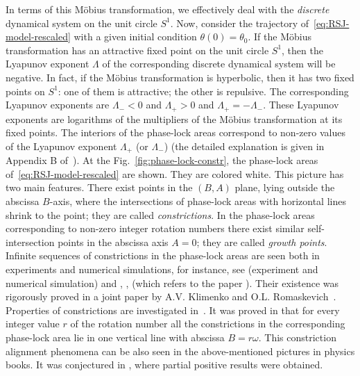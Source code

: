 \documentclass[preprint,12pt]{elsarticle}
\theoremstyle{plain}
\numberwithin{equation}{section}
\numberwithin{equation}{section}
\begin{document}
In terms of this M\"{o}bius transformation, we effectively deal with the \emph{discrete} dynamical system on the unit circle $S^1$. Now, consider the trajectory of~\eqref{eq:RSJ-model-rescaled} with a given initial condition $\theta(0)=\theta_0$. If the M\"{o}bius transformation has an attractive fixed point on the unit circle $S^1$, then the Lyapunov exponent $\Lambda$ of the corresponding discrete dynamical system will be negative. In fact, if the M\"{o}bius transformation is hyperbolic, then it has two fixed points on $S^1$:  one of them is attractive; the other is repulsive. The corresponding Lyapunov exponents are $\Lambda_{-}<0$ and $\Lambda_{+}>0$ and $\Lambda_{+}=-\Lambda_{-}$. These Lyapunov exponents are logarithms of the multipliers of the M\"{o}bius  transformation at its fixed points. The interiors of the phase-lock areas correspond to non-zero values of the Lyapunov exponent $\Lambda_{+}$ (or $\Lambda_{-}$) (the detailed explanation is given in Appendix B of~\cite{alexandrov2025}). At the Fig.~\ref{fig:phase-lock-constr}, the phase-lock areas of~\eqref{eq:RSJ-model-rescaled} are shown. They are colored white. This picture has two main features. There exist points in the $(B,A)$ plane, lying outside the abscissa $B$-axis, where the intersections of phase-lock areas with horizontal lines shrink to the point; they are called \emph{constrictions}.  In the phase-lock areas corresponding to non-zero integer rotation numbers there exist similar self-intersection points in the abscissa axis $A=0$; they  are called \emph{growth points}. Infinite sequences of constrictions in the phase-lock areas are seen both in experiments and numerical simulations, for instance, see \cite[fig. 3]{panghotra2020giant} (experiment and numerical simulation) and \cite[p. 193, fig. 11.4]{lich-rus}, 
\cite[p. 88, fig. 5.2]{likh-ulr},  \cite[p. 339, fig. 11.4]{lich} (which refers to the paper \cite{ls}). Their existence was rigorously proved in a joint paper by A.V. Klimenko and O.L. Romaskevich~\cite{klim-rom}. Properties of constrictions are investigated in~\cite{glutsyuk2014adjacency,glutsyuk2019constrictions,glutsyuk2023-germs,bibilo2022families}. It was proved in \cite{bibilo2022families} that for every integer value $r$ of the rotation number all the constrictions in the corresponding phase-lock area lie in one vertical line with abscissa $B=r\omega$. This constriction alignment phenomena can be also seen in the above-mentioned pictures in physics books. It was conjectured in \cite{glutsyuk2014adjacency}, where partial positive results were obtained. 
\end{document}
